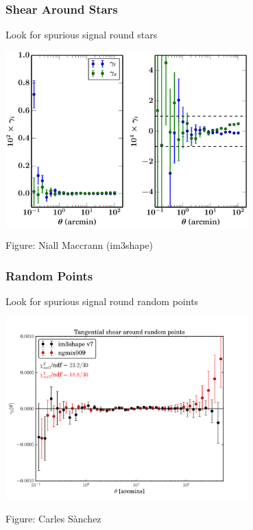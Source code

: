 \documentclass{beamer}
\begin{document}
\frame
{
    \frametitle{Shear Around Stars}

    Look for spurious signal round stars

    \begin{center}
        \includegraphics[width=0.7\textwidth]{star_gal_cs85_m16-22.pdf}
    \end{center}
    {\tiny Figure: Niall Maccrann (im3shape)}
}


\frame
{
    \frametitle{Random Points}

    Look for spurious signal round random points

    \begin{center}
        \includegraphics[width=0.7\textwidth]{random_points_im3shape_ngmix.pdf}
    \end{center}
    {\tiny Figure: Carles S\`{a}nchez}
}
\end{document}

